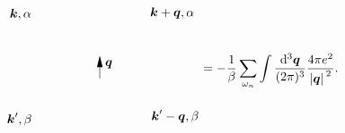 \begin{equation}
\begin{gathered}
\begin{tikzpicture}[x=0.75pt,y=0.75pt,yscale=-1,xscale=1]
            \draw    (169.09,129.1) -- (169.09,107.04) ;
            \draw [shift={(169.09,105.04)}, rotate = 450] [fill={rgb, 255:red, 0; green, 0; blue, 0 }  ][line width=0.08]  [draw opacity=0] (12,-3) -- (0,0) -- (12,3) -- cycle    ;
            
            \draw (97.72,60.8) node [anchor=east] [inner sep=0.75pt]    {$\boldsymbol{k} ,\alpha $};
            \draw (221.22,59.47) node [anchor=west] [inner sep=0.75pt]    {$\boldsymbol{k} +\boldsymbol{q} ,\alpha $};
            \draw (173.48,108.5) node [anchor=north west][inner sep=0.75pt]    {$\boldsymbol{q}$};
            \draw (98.17,172.51) node [anchor=east] [inner sep=0.75pt]    {$\boldsymbol{k} ',\beta $};
            \draw (222.46,169.26) node [anchor=west] [inner sep=0.75pt]    {$\boldsymbol{k} '-\boldsymbol{q} ,\beta $};
            \end{tikzpicture}
    \end{gathered} = - \frac{1}{\beta} \sum_{\omega_n} \int \frac{\dd[3]{\vb*{q}}}{(2\pi)^3} \frac{4\pi e^2}{\abs*{\vb*{q}}^2}.
\end{equation}